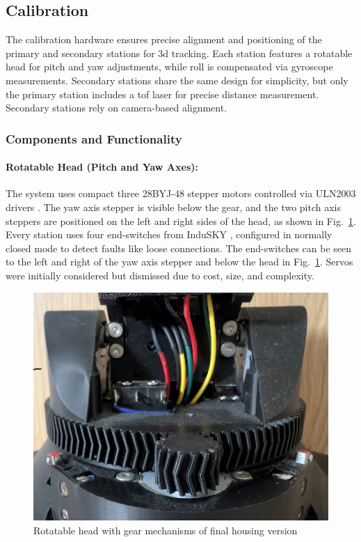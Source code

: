 \subsection{Calibration}

The calibration hardware ensures precise alignment and positioning of the primary and secondary stations for \acrshort{3d} tracking. Each station features a rotatable head for pitch and yaw adjustments, while roll is compensated via gyroscope measurements. Secondary stations share the same design for simplicity, but only the primary station includes a \acrshort{tof} laser for precise distance measurement. Secondary stations rely on camera-based alignment.

\subsubsection*{Components and Functionality}

\paragraph{Rotatable Head (Pitch and Yaw Axes):}
The system uses compact three 28BYJ-48 stepper motors controlled via ULN2003 drivers \cite{angeek_28byj_48}. The yaw axis stepper is visible below the gear, and the two pitch axis steppers are positioned on the left and right sides of the head, as shown in Fig.~\ref{fig:gearmechanisms}. Every station uses four end-switches from InduSKY \cite{indusky_microswitch}, configured in normally closed mode to detect faults like loose connections. The end-switches can be seen to the left and right of the yaw axis stepper and below the head in Fig.~\ref{fig:gearmechanisms}. Servos \cite{miuzei_servos} were initially considered but dismissed due to cost, size, and complexity.

\begin{figure}[H]
	\centering
	\includegraphics[width=1.0\linewidth]{figures/gear_mechanisms}
	\caption{Rotatable head with gear mechanisms of final housing version}
	\label{fig:gearmechanisms}
\end{figure}

